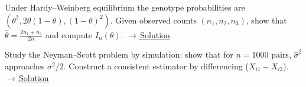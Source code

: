 \documentclass[main.tex]{subfiles}
\begin{document}
\begin{exercise}\label{exr:11-3}
Under Hardy--Weinberg equilibrium the genotype probabilities are $(\theta^2,2\theta(1-\theta),(1-\theta)^2)$. Given observed counts $(n_1,n_2,n_3)$, show that $\hat\theta=\frac{2n_1+n_2}{2n}$ and compute $I_n(\theta)$.
\hfill\hyperref[coz:11-3]{\footnotesize$\rightarrow$\,Solution}
\end{exercise}

\begin{exercise}\label{exr:11-4}
Study the Neyman--Scott problem by simulation: show that for $n=1000$ pairs, $\hat\sigma^2$ approaches $\sigma^2/2$. Construct a consistent estimator by differencing ($X_{i1}-X_{i2}$).
\hfill\hyperref[coz:11-4]{\footnotesize$\rightarrow$\,Solution}
\end{exercise}

\end{document}
